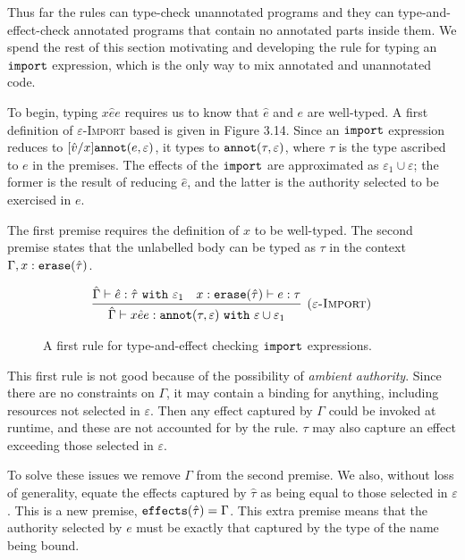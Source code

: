 Thus far the rules can type-check unannotated programs and they can type-and-effect-check annotated programs that contain no annotated parts inside them. We spend the rest of this section motivating and developing the rule for typing an $\mathtt{import}$ expression, which is the only way to mix annotated and unannotated code.

To begin, typing ${x}{\hat e}{e}$ requires us to know that $\hat e$ and $e$ are well-typed. A first definition of \textsc{$\varepsilon$-Import} based is given in Figure 3.14. Since an $\mathtt{import}$ expression reduces to $[\hat v/x]\mathtt{annot}(e, \varepsilon)$, it types to $\mathtt{annot}(\tau, \varepsilon)$, where $\tau$ is the type ascribed to $e$ in the premises. The effects of the $\mathtt{import}$ are approximated as $\varepsilon_1 \cup \varepsilon$; the former is the result of reducing $\hat e$, and the latter is the authority selected to be exercised in $e$.

The first premise requires the definition of $x$ to be well-typed. The second premise states that the unlabelled body can be typed as $\tau$ in the context $\Gamma, x: \mathtt{erase}(\hat \tau)$.


\begin{figure}[h]

\fbox{$\tau <: \tau$}

\[
\begin{array}{c}

\infer[\textsc{($\varepsilon$-Import)}]
	{ \hat \Gamma \vdash {x}{\hat e}{e}: \kwa{annot}(\tau, \varepsilon)~\kw{with} \varepsilon \cup \varepsilon_1 }
	{ \hat \Gamma \vdash \hat e: \hat \tau~\kw{with} \varepsilon_1 & x: \kwa{erase}(\hat \tau) \vdash e: \tau }

\end{array}
\]
\vspace{-7pt}
\caption{A first rule for type-and-effect checking $\mathtt{import}$ expressions.}
\label{This is the label.}
\end{figure}

This first rule is not good because of the possibility of \textit{ambient authority}. Since there are no constraints on $\Gamma$, it may contain a binding for anything, including resources not selected in $\varepsilon$. Then any effect captured by $\Gamma$ could be invoked at runtime, and these are not accounted for by the rule. $\tau$ may also capture an effect exceeding those selected in $\varepsilon$.

To solve these issues we remove $\Gamma$ from the second premise. We also, without loss of generality, equate the effects captured by $\hat \tau$ as being equal to those selected in $\varepsilon$. This is a new premise, $\mathtt{effects}(\hat \tau) = \Gamma$. This extra premise means that the authority selected by $e$ must be exactly that captured by the type of the name being bound.

